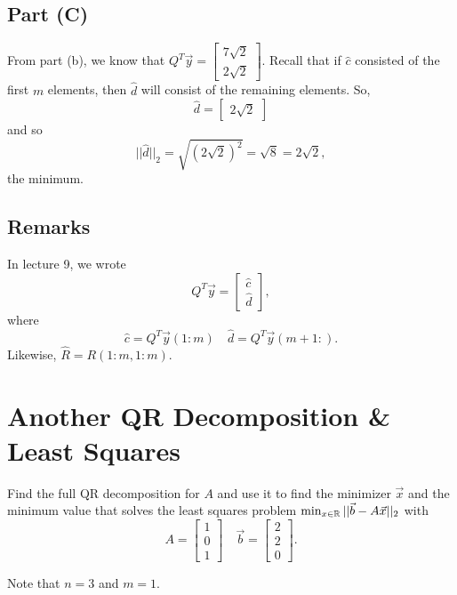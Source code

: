 \documentclass[letterpaper]{article}
\newcommand{\0}{\mathbf{0}}
\begin{document}
\subsection*{Part (C)}
From part (b), we know that $Q^T \vec{y} = \begin{bmatrix}
    7\sqrt{2} \\ 2\sqrt{2}
\end{bmatrix}$. Recall that if $\hat{c}$ consisted of the first $m$ elements, then $\hat{d}$ will consist of the remaining elements. So, \[\hat{d} = \begin{bmatrix}
    2\sqrt{2}
\end{bmatrix}\] and so \[||\hat{d}||_2 = \sqrt{(2\sqrt{2})^2} = \sqrt{8} = 2\sqrt{2},\] the minimum.


\subsection*{Remarks}
In lecture 9, we wrote 
\[Q^T\vec{y} = \begin{bmatrix}
    \hat{c} \\ \hat{d}
\end{bmatrix},\] where 
\[\hat{c} = Q^T\vec{y}(1:m) \quad \hat{d} = Q^T\vec{y}(m + 1:).\] Likewise, $\hat{R} = R(1:m, 1:m)$.








\newpage 
\section{Another QR Decomposition \& Least Squares}
\begin{mdframed}
    Find the full QR decomposition for $A$ and use it to find the minimizer $\vec{x}$ and the minimum value that solves the least squares problem $\min_{x \in \mathbb{R}} ||\vec{b} - A\vec{x}||_2$ with \[A = \begin{bmatrix}
        1 \\ 0 \\ 1
    \end{bmatrix} \quad \vec{b} = \begin{bmatrix}
        2 \\ 2 \\ 0
    \end{bmatrix}.\]
\end{mdframed}
Note that $n = 3$ and $m = 1$. 
\end{document}
